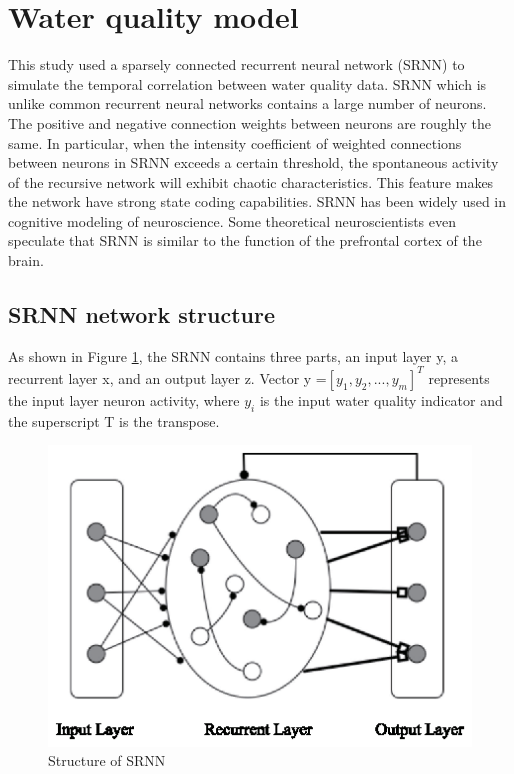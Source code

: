 \documentclass[runningheads]{llncs}
\begin{document}
\section{Water quality model}
This study used a sparsely connected recurrent neural network (SRNN)
to simulate the temporal correlation between water quality data. 
SRNN which is unlike common recurrent neural networks contains a 
large number of neurons. The positive and negative connection 
weights between neurons are roughly the same. In particular, 
when the intensity coefficient of weighted connections between 
neurons in SRNN exceeds a certain threshold, the spontaneous activity 
of the recursive network will exhibit chaotic characteristics\cite{RN17}. 
This feature makes the network have strong state coding capabilities. 
SRNN has been widely used in cognitive modeling of neuroscience. 
Some theoretical neuroscientists even speculate that SRNN is similar 
to the function of the prefrontal cortex of the brain\cite{RN18}.
\subsection{SRNN network structure}
As shown in Figure \ref{Structure of SRNN}, 
the SRNN contains three parts, an input layer y, a recurrent layer x, and an output layer z.
Vector y =$\left[y_1,y_2,...,y_m\right]^T$ represents the input layer neuron activity,
 where $y_i$ is the input water quality indicator and the superscript T is the transpose.

\begin{figure}[htbp]
\centering
\includegraphics[width=\columnwidth]{Structure_of_SRNN}
\caption{Structure of SRNN}
\label{Structure of SRNN}
\end{figure}
\end{document}
